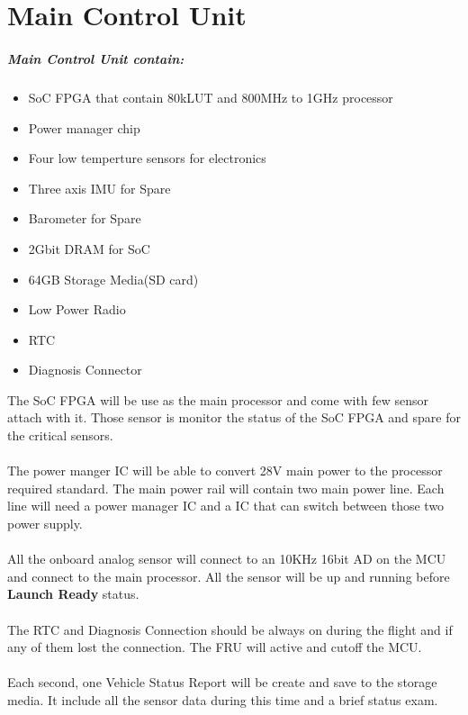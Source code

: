 \documentclass[12pt,article]{memoir}
\begin{document}
\section{Main Control Unit}
\subparagraph{Main Control Unit contain:}
\begin{itemize}
	\item SoC FPGA that contain 80kLUT and 800MHz to 1GHz processor
	\item Power manager chip 
	\item Four low temperture sensors for electronics
	\item Three axis IMU for Spare
	\item Barometer for Spare
	\item 2Gbit DRAM for SoC
	\item 64GB Storage Media(SD card)
	\item Low Power Radio
	\item RTC
	\item Diagnosis Connector
\end{itemize}
The SoC FPGA will be use as the main processor and come with few sensor attach with it. Those sensor is monitor the status of the SoC FPGA and spare for the critical sensors.\\\\
The power manger IC will be able to convert 28V main power to the processor required standard. The main power rail will contain two main power line. Each line will need a power manager IC and a IC that can switch between those two power supply.\\\\
All the onboard analog sensor will connect to an 10KHz 16bit AD on the MCU and connect to the main processor. All the sensor will be up and running before \textbf{Launch Ready} status.\\\\
The RTC and Diagnosis Connection should be always on during the flight and if any of them lost the connection. The FRU will active and cutoff the MCU.\\\\
Each second, one Vehicle Status Report will be create and save to the storage media. It include all the sensor data during this time and a brief status exam.
\end{document}
